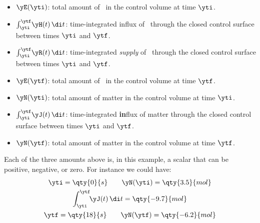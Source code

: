 \begin{itemize}
\item $\yE(\yti)$: total amount of \energym\ in the control volume at time $\yti$.

\item $\int_{\yti}^{\ytf}\!\yH(t)\, \di t$: time-integrated influx of \energym\ through the closed control surface between times $\yti$ and $\ytf$.

\item $\int_{\yti}^{\ytf}\!\yR(t)\, \di t$: time-integrated \emph{supply} of \energym\ through the closed control surface between times $\yti$ and $\ytf$.

\item $\yE(\ytf)$: total amount of \energym\ in the control volume at time $\ytf$.
\item $\yN(\yti)$: total amount of matter in the control volume at time $\yti$.

\item $\int_{\yti}^{\ytf}\!\yJ(t)\, \di t$: time-integrated \textbf{in}flux of matter through the closed control surface between times $\yti$ and $\ytf$.

\item $\yN(\ytf)$: total amount of matter in the control volume at time $\ytf$.
\end{itemize}

Each of the three amounts above is, in this example, a scalar that can be positive, negative, or zero. For instance we could have:
\begin{equation*}
  \begin{gathered}
    \yti = \qty{0}{s} \qquad \yN(\yti) = \qty{3.5}{mol}
    \\
    \int_{\yti}^{\ytf}\!\!\yJ(t)\, \di t = \qty{-9.7}{mol}
    \\
    \ytf = \qty{18}{s} \qquad \yN(\ytf) = \qty{-6.2}{mol}
  \end{gathered}
\end{equation*}


\medskip

